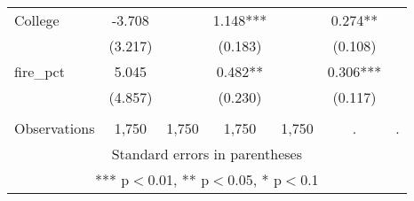 \begin{tabular}{lcccccc}
College & -3.708 &  & 1.148*** &  & 0.274** &  \\
 & (3.217) &  & (0.183) &  & (0.108) &  \\
fire\_pct & 5.045 &  & 0.482** &  & 0.306*** &  \\
 & (4.857) &  & (0.230) &  & (0.117) &  \\
 &  &  &  &  &  &  \\
 Observations & 1,750 & 1,750 & 1,750 & 1,750 & . & . \\ \hline
\multicolumn{7}{c}{ Standard errors in parentheses} \\
\multicolumn{7}{c}{ *** p$<$0.01, ** p$<$0.05, * p$<$0.1} \\
\end{tabular}

